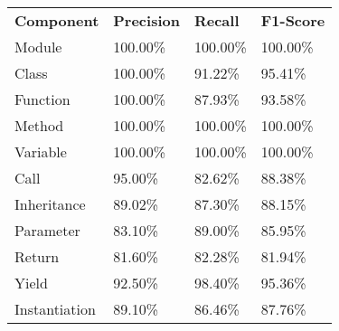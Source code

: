 \begin{tabularx}{\linewidth}{XXXX}
\toprule
\textbf{Component} & \textbf{Precision} & \textbf{Recall} & \textbf{F1-Score} \\
\cmidrule{1-1}\cmidrule{2-2}\cmidrule{3-3}\cmidrule{4-4}
Module & 100.00\% & 100.00\% & 100.00\% \\
\cmidrule{1-1}\cmidrule{2-2}\cmidrule{3-3}\cmidrule{4-4}
Class & 100.00\% & 91.22\% & 95.41\% \\
\cmidrule{1-1}\cmidrule{2-2}\cmidrule{3-3}\cmidrule{4-4}
Function & 100.00\% & 87.93\% & 93.58\% \\
\cmidrule{1-1}\cmidrule{2-2}\cmidrule{3-3}\cmidrule{4-4}
Method & 100.00\% & 100.00\% & 100.00\% \\
\cmidrule{1-1}\cmidrule{2-2}\cmidrule{3-3}\cmidrule{4-4}
Variable & 100.00\% & 100.00\% & 100.00\% \\
\cmidrule{1-1}\cmidrule{2-2}\cmidrule{3-3}\cmidrule{4-4}
Call & 95.00\% & 82.62\% & 88.38\% \\
\cmidrule{1-1}\cmidrule{2-2}\cmidrule{3-3}\cmidrule{4-4}
Inheritance & 89.02\% & 87.30\% & 88.15\% \\
\cmidrule{1-1}\cmidrule{2-2}\cmidrule{3-3}\cmidrule{4-4}
Parameter & 83.10\% & 89.00\% & 85.95\% \\
\cmidrule{1-1}\cmidrule{2-2}\cmidrule{3-3}\cmidrule{4-4}
Return & 81.60\% & 82.28\% & 81.94\% \\
\cmidrule{1-1}\cmidrule{2-2}\cmidrule{3-3}\cmidrule{4-4}
Yield & 92.50\% & 98.40\% & 95.36\% \\
\cmidrule{1-1}\cmidrule{2-2}\cmidrule{3-3}\cmidrule{4-4}
Instantiation & 89.10\% & 86.46\% & 87.76\% \\
\bottomrule
\end{tabularx}

